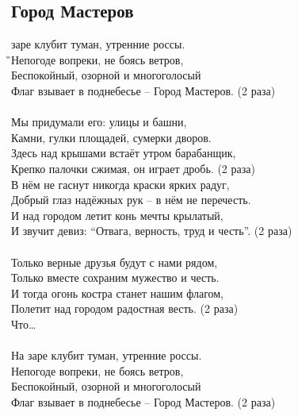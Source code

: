 \documentclass[fleqn,a5paper,12pt,twoside]{guitartabs}
\begin{document}
\subsection*{Город Мастеров}
     заре клубит туман,\Dm{} утренние россы.\\
    \G{}Непогоде вопреки,\C{} не боясь ветров,\\
    \F{}Беспокойный, озорной \Hm{}и многоголосый\\
    \E{}Флаг взывает в поднебесье -- \Am{}Город Мастеров. (2 раза)\\
    \\
    \-\hspace{3mm}Мы придумали его: улицы и башни,\\
    \-\hspace{3mm}Камни, гулки площадей, сумерки дворов.\\
    \-\hspace{3mm}Здесь над крышами встаёт утром барабанщик,\\
    \-\hspace{3mm}Крепко палочки сжимая, он играет дробь. (2 раза)\\

    В нём не гаснут никогда краски ярких радуг,\\
    Добрый глаз надёжных рук -- в нём не перечесть.\\
    И над городом летит конь мечты крылатый,\\
    И звучит девиз: ``Отвага, верность, труд и честь''. (2 раза)\\
    \\
    \-\hspace{3mm}Только верные друзья будут с нами рядом,\\
    \-\hspace{3mm}Только вместе сохраним мужество и честь.\\
    \-\hspace{3mm}И тогда огонь костра станет нашим флагом,\\
    \-\hspace{3mm}Полетит над городом радостная весть. (2 раза)\\
    \-\hspace{3mm}Что…\\
    \\
    На заре клубит туман, утренние россы.\\
    Непогоде вопреки, не боясь ветров,\\
    Беспокойный, озорной и многоголосый\\
    Флаг взывает в поднебесье -- Город Мастеров. (2 раза)\\
\end{document}
